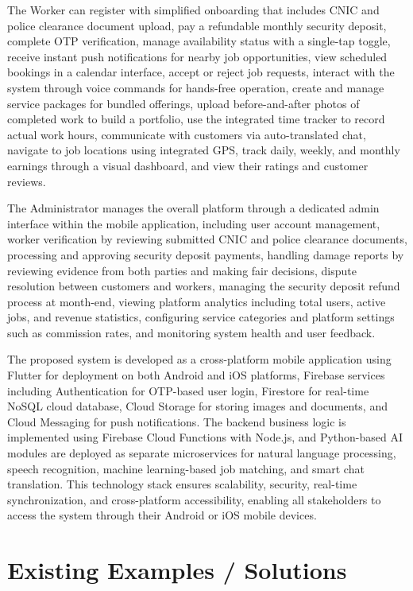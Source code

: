 \documentclass[12pt,a4paper]{report}
\begin{document}
The Worker can register with simplified onboarding that includes CNIC and police
clearance document upload, pay a refundable monthly security deposit, complete
OTP verification, manage availability status with a single-tap toggle, receive
instant push notifications for nearby job opportunities, view scheduled bookings
in a calendar interface, accept or reject job requests, interact with the system
through voice commands for hands-free operation, create and manage service
packages for bundled offerings, upload before-and-after photos of completed work
to build a portfolio, use the integrated time tracker to record actual work
hours, communicate with customers via auto-translated chat, navigate to job
locations using integrated GPS, track daily, weekly, and monthly earnings
through a visual dashboard, and view their ratings and customer reviews.

The Administrator manages the overall platform through a dedicated admin
interface within the mobile application, including user account management,
worker verification by reviewing submitted CNIC and police clearance documents,
processing and approving security deposit payments, handling damage reports by
reviewing evidence from both parties and making fair decisions, dispute
resolution between customers and workers, managing the security deposit refund
process at month-end, viewing platform analytics including total users, active
jobs, and revenue statistics, configuring service categories and platform
settings such as commission rates, and monitoring system health and user
feedback.

The proposed system is developed as a cross-platform mobile application using
Flutter for deployment on both Android and iOS platforms, Firebase services
including Authentication for OTP-based user login, Firestore for real-time
NoSQL cloud database, Cloud Storage for storing images and documents, and Cloud
Messaging for push notifications. The backend business logic is implemented
using Firebase Cloud Functions with Node.js, and Python-based AI modules are
deployed as separate microservices for natural language processing, speech
recognition, machine learning-based job matching, and smart chat translation.
This technology stack ensures scalability, security, real-time synchronization,
and cross-platform accessibility, enabling all stakeholders to access the system
through their Android or iOS mobile devices.

\section{Existing Examples / Solutions}
\end{document}
